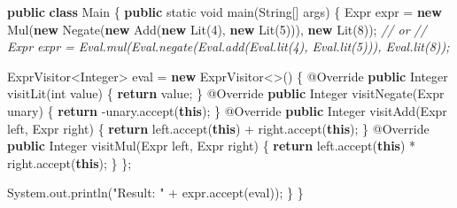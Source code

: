 \documentclass[]{article}
\newenvironment{Shaded}{}{}
\newcommand{\AttributeTok}[1]{\textcolor[rgb]{0.49,0.56,0.16}{#1}}
\newcommand{\BuiltInTok}[1]{\textcolor[rgb]{0.00,0.50,0.00}{#1}}
\newcommand{\CommentTok}[1]{\textcolor[rgb]{0.38,0.63,0.69}{\textit{#1}}}
\newcommand{\ControlFlowTok}[1]{\textcolor[rgb]{0.00,0.44,0.13}{\textbf{#1}}}
\newcommand{\DataTypeTok}[1]{\textcolor[rgb]{0.56,0.13,0.00}{#1}}
\newcommand{\DecValTok}[1]{\textcolor[rgb]{0.25,0.63,0.44}{#1}}
\newcommand{\FunctionTok}[1]{\textcolor[rgb]{0.02,0.16,0.49}{#1}}
\newcommand{\KeywordTok}[1]{\textcolor[rgb]{0.00,0.44,0.13}{\textbf{#1}}}
\newcommand{\NormalTok}[1]{#1}
\newcommand{\OperatorTok}[1]{\textcolor[rgb]{0.40,0.40,0.40}{#1}}
\newcommand{\StringTok}[1]{\textcolor[rgb]{0.25,0.44,0.63}{#1}}
\begin{document}
\begin{Shaded}
\begin{Highlighting}[]
\KeywordTok{public} \KeywordTok{class}\NormalTok{ Main }\OperatorTok{\{}
    \KeywordTok{public} \DataTypeTok{static} \DataTypeTok{void} \FunctionTok{main}\OperatorTok{(}\BuiltInTok{String}\OperatorTok{[]}\NormalTok{ args}\OperatorTok{)} \OperatorTok{\{}
\NormalTok{        Expr expr }\OperatorTok{=} \KeywordTok{new} \FunctionTok{Mul}\OperatorTok{(}\KeywordTok{new} \FunctionTok{Negate}\OperatorTok{(}\KeywordTok{new} \FunctionTok{Add}\OperatorTok{(}\KeywordTok{new} \FunctionTok{Lit}\OperatorTok{(}\DecValTok{4}\OperatorTok{),} \KeywordTok{new} \FunctionTok{Lit}\OperatorTok{(}\DecValTok{5}\OperatorTok{))),} \KeywordTok{new} \FunctionTok{Lit}\OperatorTok{(}\DecValTok{8}\OperatorTok{));}
        \CommentTok{// or}
        \CommentTok{// Expr expr = Eval.mul(Eval.negate(Eval.add(Eval.lit(4), Eval.lit(5))), Eval.lit(8));}

\NormalTok{        ExprVisitor}\OperatorTok{\textless{}}\BuiltInTok{Integer}\OperatorTok{\textgreater{}}\NormalTok{ eval }\OperatorTok{=} \KeywordTok{new}\NormalTok{ ExprVisitor}\OperatorTok{\textless{}\textgreater{}()} \OperatorTok{\{}
            \AttributeTok{@Override} \KeywordTok{public} \BuiltInTok{Integer} \FunctionTok{visitLit}\OperatorTok{(}\DataTypeTok{int}\NormalTok{ value}\OperatorTok{)} \OperatorTok{\{}
                \ControlFlowTok{return}\NormalTok{ value}\OperatorTok{;}
            \OperatorTok{\}}
            \AttributeTok{@Override} \KeywordTok{public} \BuiltInTok{Integer} \FunctionTok{visitNegate}\OperatorTok{(}\NormalTok{Expr unary}\OperatorTok{)} \OperatorTok{\{}
                \ControlFlowTok{return} \OperatorTok{{-}}\NormalTok{unary}\OperatorTok{.}\FunctionTok{accept}\OperatorTok{(}\KeywordTok{this}\OperatorTok{);}
            \OperatorTok{\}}
            \AttributeTok{@Override} \KeywordTok{public} \BuiltInTok{Integer} \FunctionTok{visitAdd}\OperatorTok{(}\NormalTok{Expr left}\OperatorTok{,}\NormalTok{ Expr right}\OperatorTok{)} \OperatorTok{\{}
                \ControlFlowTok{return}\NormalTok{ left}\OperatorTok{.}\FunctionTok{accept}\OperatorTok{(}\KeywordTok{this}\OperatorTok{)} \OperatorTok{+}\NormalTok{ right}\OperatorTok{.}\FunctionTok{accept}\OperatorTok{(}\KeywordTok{this}\OperatorTok{);}
            \OperatorTok{\}}
            \AttributeTok{@Override} \KeywordTok{public} \BuiltInTok{Integer} \FunctionTok{visitMul}\OperatorTok{(}\NormalTok{Expr left}\OperatorTok{,}\NormalTok{ Expr right}\OperatorTok{)} \OperatorTok{\{}
                \ControlFlowTok{return}\NormalTok{ left}\OperatorTok{.}\FunctionTok{accept}\OperatorTok{(}\KeywordTok{this}\OperatorTok{)} \OperatorTok{*}\NormalTok{ right}\OperatorTok{.}\FunctionTok{accept}\OperatorTok{(}\KeywordTok{this}\OperatorTok{);}
            \OperatorTok{\}}
        \OperatorTok{\};}

        \BuiltInTok{System}\OperatorTok{.}\FunctionTok{out}\OperatorTok{.}\FunctionTok{println}\OperatorTok{(}\StringTok{"Result: "} \OperatorTok{+}\NormalTok{ expr}\OperatorTok{.}\FunctionTok{accept}\OperatorTok{(}\NormalTok{eval}\OperatorTok{));}
    \OperatorTok{\}}
\OperatorTok{\}}
\end{Highlighting}
\end{Shaded}
\end{document}

